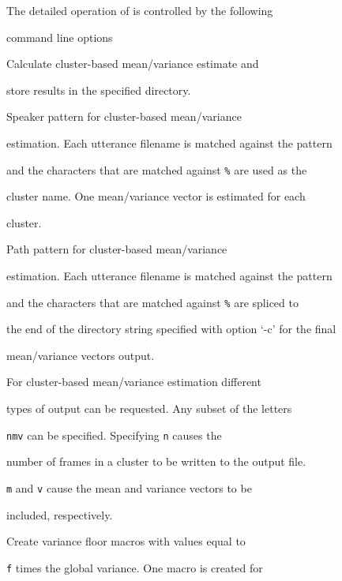 The detailed operation of  is controlled by the following


command line options


\begin{optlist}


   Calculate cluster-based mean/variance estimate and


  store results in the specified directory.





   Speaker pattern for cluster-based mean/variance


  estimation. Each utterance filename is matched against the pattern


  and the characters that are matched against \verb|%| are used as the


  cluster name. One mean/variance vector is estimated for each


  cluster.





   Path pattern for cluster-based mean/variance


  estimation. Each utterance filename is matched against the pattern


  and the characters that are matched against \verb|%| are spliced to


  the end of the directory string specified with option `-c' for the final


  mean/variance vectors output. 


  


   For cluster-based mean/variance estimation different


  types of output can be requested. Any subset of the letters


  \texttt{nmv} can be specified. Specifying \texttt{n} causes the


  number of frames in a cluster to be written to the output file.


  \texttt{m} and \texttt{v} cause the mean and variance vectors to be


  included, respectively.





   Create variance floor macros with values equal to 


     \texttt{f} times the global variance.  One macro is created for



\end{optlist}
